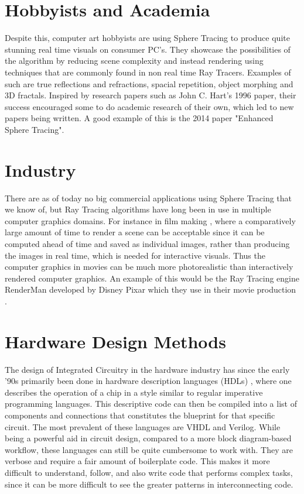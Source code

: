 	\section{ Hobbyists and Academia }

		Despite this, computer art hobbyists are using Sphere Tracing to
		produce quite stunning real time visuals on consumer PC's. They
		showcase the possibilities of the algorithm by reducing scene
		complexity and instead rendering using techniques that are commonly
		found in non real time Ray Tracers. Examples of such are true
		reflections and refractions, spacial repetition, object morphing and 3D
		fractals\cite{InigoQuilez}.  Inspired by research papers such as John
		C. Hart's 1996 paper\cite{Hart1996}, their success encouraged some
		to do academic research of their own, which led to new papers being
		written. A good example of this is the 2014 paper "Enhanced Sphere
		Tracing"\cite{Korndorfer2014}.

	\section{ Industry }		

		There are as of today no big commercial applications using Sphere Tracing
		that we know of, but Ray Tracing algorithms have long been in use in
		multiple computer graphics domains. For instance in film making
		\cite{Christensen2006}, where a comparatively large amount of time to
		render a scene can be acceptable since it can be computed ahead of time
		and saved as individual images, rather than producing the images in real
		time, which is needed for interactive visuals. Thus the computer
		graphics in movies can be much more photorealistic than interactively
		rendered computer graphics. An example of this would be the Ray Tracing
		engine RenderMan developed by Disney Pixar which they use in their movie 
		production \cite{Christensen2006}.

	\section{ Hardware Design Methods } 
	
		The design of Integrated Circuitry in the hardware industry has since
		the early '90s primarily been done in hardware description languages
		(HDLs) \cite{Chen2012}, where one describes the operation of a chip in a
		style similar to regular imperative programming languages. This
		descriptive code can then be compiled into a list of components and
		connections that constitutes the blueprint for that specific circuit.
		The most prevalent of these languages are VHDL and
		Verilog\cite{Chen2012}. While being a powerful aid in circuit design,
		compared to a more block diagram-based workflow\cite{Lauwereins2008},
		these languages can still be quite cumbersome to work with. They are
		verbose and require a fair amount of boilerplate code. This makes it
		more difficult to understand, follow, and also write code that
		performs complex tasks, since it can be more difficult to see the
		greater patterns in interconnecting code.
		
